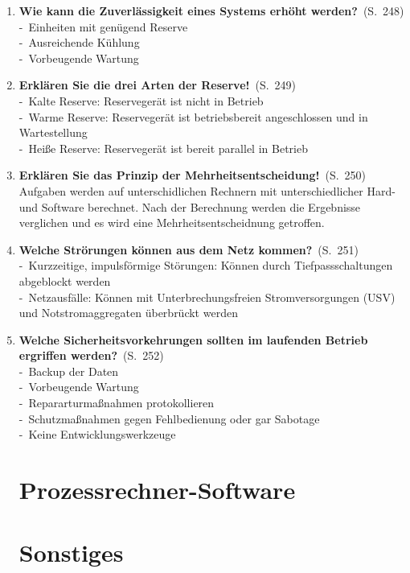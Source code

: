 \documentclass[a4paper,12pt]{article}
\newcommand{\question}[3]{\pagebreak[3]\item {\textbf{#1?}}\ (S.\ #2)#3}
\newcommand{\statement}[3]{\pagebreak[3]\item {\textbf{#1!}}\ (S.\ #2)#3}
\newcommand{\catchword}[1]{\\-\ #1}
\newcommand{\normaltext}[1]{\\#1}
\newcommand{\page}[1]{#1}
\begin{document}
\begin{enumerate}
  \question{Wie kann die Zuverlässigkeit eines Systems erhöht werden}{\page{248}}
  {
    \catchword{Einheiten mit genügend Reserve}
    \catchword{Ausreichende Kühlung}
    \catchword{Vorbeugende Wartung}
  }

  \statement{Erklären Sie die drei Arten der Reserve}{\page{249}}
  {
    \catchword{Kalte Reserve: Reservegerät ist nicht in Betrieb}
    \catchword{Warme Reserve: Reservegerät ist betriebsbereit angeschlossen und
               in Wartestellung}
    \catchword{Heiße Reserve: Reservegerät ist bereit parallel in Betrieb}
  }

  \statement{Erklären Sie das Prinzip der Mehrheitsentscheidung}{\page{250}}
  {
    \normaltext{Aufgaben werden auf unterschidlichen Rechnern mit unterschiedlicher Hard-
                und Software berechnet. Nach der Berechnung werden die Ergebnisse verglichen
                und es wird eine Mehrheitsentscheidnung getroffen.}
  }

  \question{Welche Strörungen können aus dem Netz kommen}{\page{251}}
  {
    \catchword{Kurzzeitige, impulsförmige Störungen: Können durch Tiefpassschaltungen
               abgeblockt werden}
    \catchword{Netzausfälle: Können mit Unterbrechungsfreien Stromversorgungen (USV) und
               Notstromaggregaten überbrückt werden}
  }

  \question{Welche Sicherheitsvorkehrungen sollten im laufenden Betrieb ergriffen werden}{\page{252}}
  {
    \catchword{Backup der Daten}
    \catchword{Vorbeugende Wartung}
    \catchword{Repararturmaßnahmen protokollieren}
    \catchword{Schutzmaßnahmen gegen Fehlbedienung oder gar Sabotage}
    \catchword{Keine Entwicklungswerkzeuge}
  }

  \newpage
  \section{Prozessrechner-Software}

  \newpage
  \section{Sonstiges}

\end{enumerate}
\end{document}
